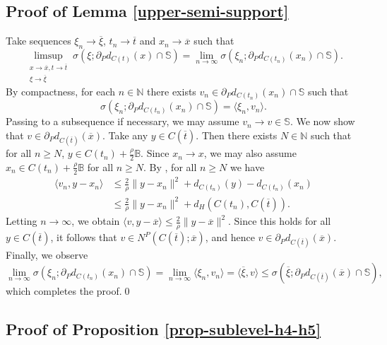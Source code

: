 \documentclass[preprint,12pt]{elsarticle}
\newcommand{\N}{\mathbb{N}}
\newcommand{\ov}{\overline}
\theoremstyle{plain}
\theoremstyle{definition}
\theoremstyle{remark}
\begin{document}
\subsection{Proof of Lemma \ref{upper-semi-support}}\label{appendix4}
 Take sequences $\xi_n\to \ov \xi$, $t_n\to \ov t$ and $x_n\to \ov x$ such that 
		\begin{equation*}
			\limsup_{\substack{x\to \ov x, t\to \ov t\\ \xi\to \ov \xi}} \sigma(\xi;\partial_P d_{C(t)}(x)\cap \mathbb{S}) = \lim_{n\to \infty} \sigma(\xi_n;\partial_P d_{C(t_n)}(x_n)\cap \mathbb{S}).
		\end{equation*}
		By compactness, for each $n\in\N$ there exists $v_n\in\partial_P d_{C(t_n)}(x_n)\cap\mathbb{S}$ such that $$\sigma(\xi_n;\partial_P d_{C(t_n)}(x_n)\cap \mathbb{S})=\langle\xi_n,v_n\rangle .$$ Passing to a subsequence if necessary, we may assume $v_n\to v\in \mathbb{S}$. We now show that $v\in \partial_P d_{C(\ov t)}(\ov x)$. Take any $y\in C(\ov t)$. Then there exists $N\in\N$ such that for all $n\geq N$, $y\in C(t_n)+\frac{\rho}{2}\mathbb{B}$. Since $x_n\to x$, we may also assume $x_n\in C(t_n) + \frac{\rho}{2}\mathbb{B}$ for all $n\geq N$. By \cite[Theorem 5]{MR4431268}, for all $n\geq N$ we have
		\begin{equation*}
			\begin{aligned}
				\langle v_n,y-x_n\rangle &\leq \frac{2}{\rho}\|y-x_n\|^2 + d_{C(t_n)}(y) - d_{C(t_n)}(x_n)\\
				&\leq \frac{2}{\rho}\|y-x_n\|^2 + d_H(C(t_n),C(\ov t)).
			\end{aligned}
		\end{equation*}
		Letting $n\to \infty$, we obtain $\langle v,y-\ov x\rangle\leq \frac{2}{\rho}\|y-\ov x\|^2$. Since this holds for all $y\in C(\ov t)$, it follows that $v\in N^P(C(\ov t);\ov x)$, and hence $v\in \partial_P d_{C(\ov t)}(\ov x)$. Finally, we observe
		\begin{equation*}
				\lim_{n\to \infty} \sigma(\xi_n;\partial_P d_{C(t_n)}(x_n)\cap \mathbb{S}) = \lim_{n\to\infty}\langle \xi_n,v_n\rangle = \langle\ov \xi,v\rangle \leq \sigma(\ov \xi;\partial_P d_{C(\ov t)}(\ov x)\cap \mathbb{S}),
		\end{equation*}
        which completes the proof.\qed

\subsection{Proof of Proposition \ref{prop-sublevel-h4-h5}}\label{appendix3}
\end{document}
